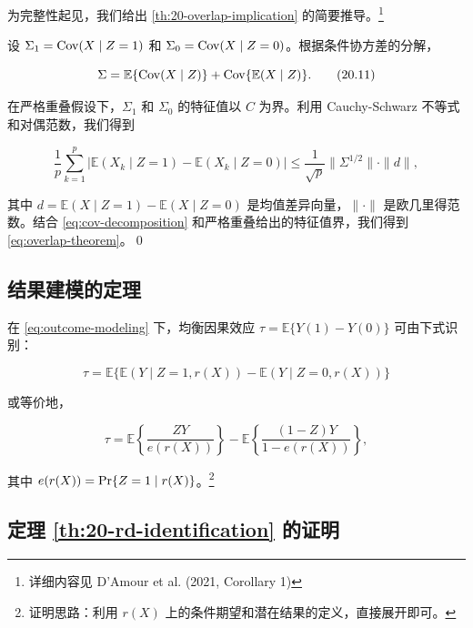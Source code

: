 为完整性起见，我们给出 \cref{th:20-overlap-implication} 的简要推导。\footnote{详细内容见 D'Amour et al. (2021, Corollary 1)}

设 $\Sigma_1 = \operatorname{Cov}(X \mid Z=1)$ 和 $\Sigma_0 = \operatorname{Cov}(X \mid Z=0)$。根据条件协方差的分解，

\begin{equation}
\Sigma = \mathbb{E}\{\operatorname{Cov}(X \mid Z)\} + \operatorname{Cov}\{\mathbb{E}(X \mid Z)\}.
\tag{20.11}
\label{eq:cov-decomposition}
\end{equation}

在严格重叠假设下，$\Sigma_1$ 和 $\Sigma_0$ 的特征值以 $C$ 为界。利用 Cauchy-Schwarz 不等式和对偶范数，我们得到

\begin{equation}
\frac{1}{p} \sum_{k=1}^p |\mathbb{E}(X_k \mid Z=1) - \mathbb{E}(X_k \mid Z=0)|
\leq \frac{1}{\sqrt{p}} \|\Sigma^{1/2}\| \cdot \|d\|,
\tag{20.12}
\label{eq:overlap-proof-step}
\end{equation}

其中 $d = \mathbb{E}(X \mid Z=1) - \mathbb{E}(X \mid Z=0)$ 是均值差异向量，$\|\cdot\|$ 是欧几里得范数。结合 \cref{eq:cov-decomposition} 和严格重叠给出的特征值界，我们得到 \cref{eq:overlap-theorem}。\qed

\subsection{结果建模的定理}\label{sec:appendix-20-outcome-modeling}

在 \cref{eq:outcome-modeling} 下，均衡因果效应 $\tau = \mathbb{E}\{Y(1) - Y(0)\}$ 可由下式识别：

\begin{equation}
\tau = \mathbb{E}\bigl\{ \mathbb{E}(Y \mid Z=1, r(X)) - \mathbb{E}(Y \mid Z=0, r(X)) \bigr\}
\tag{20.13}
\label{eq:outcome-modeling-formula}
\end{equation}

或等价地，

\begin{equation}
\tau = \mathbb{E}\left\{ \frac{ZY}{e(r(X))} \right\} - \mathbb{E}\left\{ \frac{(1-Z)Y}{1-e(r(X))} \right\},
\tag{20.14}
\label{eq:outcome-modeling-ipw}
\end{equation}

其中 $e(r(X)) = \operatorname{Pr}\{Z=1 \mid r(X)\}$。\footnote{证明思路：利用 $r(X)$ 上的条件期望和潜在结果的定义，直接展开即可。}

\subsection{定理 \cref{th:20-rd-identification} 的证明}\label{sec:appendix-20-rd-proof}

